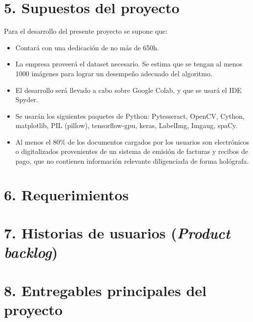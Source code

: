 \documentclass[
11pt, %
]{charter}
\begin{document}
\begin{•}
\section{5. Supuestos del proyecto}
\label{sec:supuestos}

\begin{•}%
Para el desarrollo del presente proyecto se supone que:

\begin{itemize}
	\item Contará con una dedicación de no más de 650h.
	\item La empresa proveerá el dataset necesario. Se estima que se tengan al menos 1000 imágenes para lograr un desempeño adecuado del algoritmo.
	\item El desarrollo será llevado a cabo sobre Google Colab, y que se usará el IDE Spyder.
	\item Se usarán los siguientes paquetes de Python: Pytesseract, OpenCV, Cython, matplotlib, PIL (pillow), tensorflow-gpu, keras, LabelImg, Imgaug, spaCy.
	\item Al menos el 80\% de los documentos cargados por los usuarios son electrónicos o digitalizados provenientes de un sistema de emisión de facturas y recibos de pago, que no contienen información relevante diligenciada de forma hológrafa. 
\end{itemize}

\end{•}

\section{6. Requerimientos}
\label{sec:requerimientos}



\section{7. Historias de usuarios (\textit{Product backlog})}
\label{sec:backlog}


\section{8. Entregables principales del proyecto}
\label{sec:entregables}



\end{•}
\end{document}
